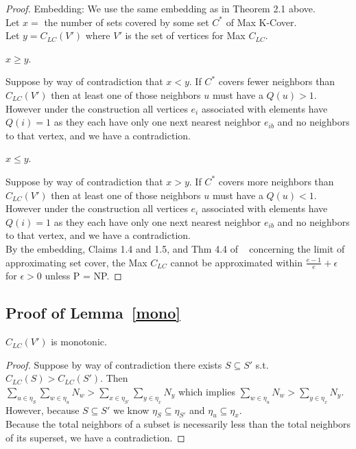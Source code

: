 \begin{proof}
Embedding: We use the same embedding as in Theorem 2.1 above.\\ 
Let $x=$ the number of sets covered by some set $C^*$ of Max K-Cover.\\
Let $y=C_{LC}(V')$ where $V'$ is the set of vertices for Max $C_{LC}$.\\ 

\begin{Claim} $x \geq y$.  \end{Claim}

Suppose by way of contradiction that $x < y$.  If $C^*$ covers fewer neighbors than $C_{LC}(V')$ then at least one of those neighbors $u$ must have a $Q(u) > 1$.  However under the construction all vertices $e_i$ associated with elements have $Q(i) = 1$ as they each have only one next nearest neighbor $e_{ib}$ and no neighbors to that vertex, and we have a contradiction. \\

\begin{Claim} $x \leq y$.  \end{Claim}

Suppose by way of contradiction that $x > y$.  If $C^*$ covers more neighbors than $C_{LC}(V')$ then at least one of those neighbors $u$ must have a $Q(u) < 1$.  However under the construction all vertices $e_i$ associated with elements have $Q(i) = 1$ as they each have only one next nearest neighbor $e_{ib}$ and no neighbors to that vertex, and we have a contradiction. \\

 By the embedding, Claims 1.4 and 1.5, and Thm 4.4 of ~\cite{feige98} concerning the limit of approximating set cover, the Max $C_{LC}$ cannot be approximated within $\frac{e - 1}e + \epsilon$ for $\epsilon > 0$ unless P = NP. \end{proof}

\subsection{Proof of Lemma~\ref{mono}}
 $C_{LC}(V')$ is monotonic.\\ 
\begin{proof}
Suppose by way of contradiction there exists $S \subseteq S'$ s.t. $C_{LC}(S) > C_{LC}(S')$. Then \\
$ \sum_{u \in \eta_S} \sum_{w \in \eta_u} N_w >  \sum_{x \in  \eta_{S'}} \sum_{y \in \eta_x} N_y$ which implies $\sum_{w \in \eta_u} N_w > \sum_{y \in \eta_x} N_y$. \\
 However, because $S \subseteq S'$ we know $\eta_S \subseteq \eta_{S'}$ and  $\eta_u \subseteq  \eta_x$. \\
Because the total neighbors of a subset is necessarily less than the total neighbors of its superset, we have a contradiction.\end{proof}


